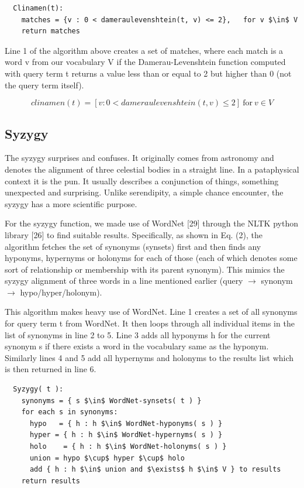 \begin{lstlisting}
  Clinamen(t):
    matches = {v : 0 < dameraulevenshtein(t, v) <= 2},   for v $\in$ V
    return matches
\end{lstlisting}

Line 1 of the algorithm above creates a set of matches, where each match is a word v from our vocabulary V if the Damerau-Levenshtein function computed with query term t returns a value less than or equal to 2 but higher than 0 (not the query term itself).

\begin{equation}
  clinamen(t) = [v \colon 0 < dameraulevenshtein(t,v) \leq 2] \ \text{for} \ v \in V
\label{eq:clinamen}
\end{equation}

\subsection{Syzygy}

The syzygy surprises and confuses. It originally comes from astronomy and denotes the alignment of three celestial bodies in a straight line. In a pataphysical context it is the pun. It usually describes a conjunction of things, something unexpected and surprising. Unlike serendipity, a simple chance encounter, the syzygy has a more scientific purpose.

For the syzygy function, we made use of WordNet [29] through the NLTK python library [26] to find suitable results. Specifically, as shown in Eq. (2), the algorithm fetches the set of synonyms (synsets) first and then finds any hyponyms, hypernyms or holonyms for each of those (each of which denotes some sort of relationship or membership with its parent synonym). This mimics the syzygy alignment of three words in a line mentioned earlier (query $\to$ synonym $\to$ hypo/hyper/holonym).

This algorithm makes heavy use of WordNet. Line 1 creates a set of all synonyms for query term t from WordNet. It then loops through all individual items in the list of synonyms in line 2 to 5. Line 3 adds all hyponyms h for the current synonym s if there exists a word in the vocabulary same as the hyponym. Similarly lines 4 and 5 add all hypernyms and holonyms to the results list which is then returned in line 6.

\begin{lstlisting}
  Syzygy( t ):
    synonyms = { s $\in$ WordNet-synsets( t ) }
    for each s in synonyms:
      hypo   = { h : h $\in$ WordNet-hyponyms( s ) }
      hyper = { h : h $\in$ WordNet-hypernyms( s ) }
      holo    = { h : h $\in$ WordNet-holonyms( s ) }
      union = hypo $\cup$ hyper $\cup$ holo
      add { h : h $\in$ union and $\exists$ h $\in$ V } to results
    return results
\end{lstlisting}

